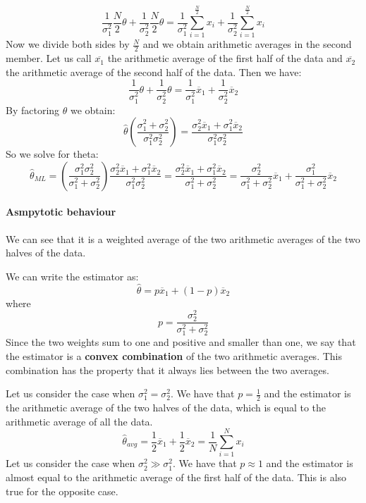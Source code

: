 \[
    \frac{1}{\sigma_1^2} \frac{N}{2} \theta + \frac{1}{\sigma_2^2} \frac{N}{2} \theta = \frac{1}{\sigma_1^2} \sum_{i=1}^{\frac{N}{2}} x_i + \frac{1}{\sigma_2^2} \sum_{i=1}^{\frac{N}{2}} x_i
\]
Now we divide both sides by $\frac{N}{2}$ and we obtain arithmetic averages in the second member. Let us call $\overline{x_1}$ the arithmetic average of the first half of the data and $\overline{x_2}$ the arithmetic average of the second half of the data. Then we have:
\[
    \frac{1}{\sigma_1^2} \theta + \frac{1}{\sigma_2^2} \theta = \frac{1}{\sigma_1^2} \overline{x}_1 + \frac{1}{\sigma_2^2} \overline{x}_2
\]
By factoring $\theta$ we obtain:
\[
    \hat{\theta} \left(\frac{\sigma_1^2 + \sigma_2^2}{\sigma_1^2\sigma_2^2}\right) = \frac{\sigma_2^2\overline{x}_1 + \sigma_1^2\overline{x}_2}{\sigma_1^2 \sigma_2^2}
\]
So we solve for theta:
\[
    \hat{\theta}_{ML} = \left(\frac{\sigma_1^2\sigma_2^2}{\sigma_1^2 + \sigma_2^2}\right) \frac{\sigma_2^2\overline{x}_1 + \sigma_1^2\overline{x}_2}{\sigma_1^2 \sigma_2^2} = \frac{\sigma_2^2\overline{x}_1 + \sigma_1^2\overline{x}_2}{\sigma_1^2 + \sigma_2^2} = \frac{\sigma_2^2}{\sigma_1^2 + \sigma_2^2} \overline{x}_1 + \frac{\sigma_1^2}{\sigma_1^2 + \sigma_2^2} \overline{x}_2
\]
\paragraph*{Asmpytotic behaviour}
We can see that it is a weighted average of the two arithmetic averages of the two halves of the data.

We can write the estimator as:
\[
    \hat{\theta} = p \overline{x}_1 + (1 - p) \overline{x}_2
\]
where
\[
    p = \frac{\sigma_2^2}{\sigma_1^2 + \sigma_2^2}
\]
Since the two weights sum to one and positive and smaller than one, we say that the estimator is a \textbf{convex combination} of the two arithmetic averages. This combination has the property that it always lies between the two averages.

Let us consider the case when $\sigma_1^2 = \sigma_2^2$. We have that $p = \frac{1}{2}$ and the estimator is the arithmetic average of the two halves of the data, which is equal to the arithmetic average of all the data.
\[
    \hat{\theta}_{avg} = \frac{1}{2} \overline{x}_1 + \frac{1}{2} \overline{x}_2 = \frac{1}{N} \sum_{i=1}^{N} x_i
\]
Let us consider the case when $\sigma_2^2 \gg \sigma_1^2$. We have that $p \approx 1$ and the estimator is almost equal to the arithmetic average of the first half of the data. This is also true for the opposite case.


